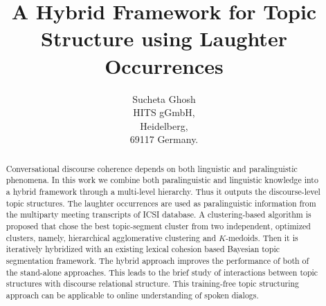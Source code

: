 \documentclass{article}
\title{A Hybrid Framework for Topic Structure using Laughter Occurrences}
\author{
Sucheta Ghosh\\
        HITS gGmbH,\\
        Heidelberg,\\
        69117 Germany.
}
\begin{document}
\maketitle

\begin{abstract}
Conversational discourse coherence depends on both linguistic and paralinguistic phenomena. In this work we combine both paralinguistic and linguistic knowledge into a hybrid framework through a multi-level hierarchy. Thus it outputs the discourse-level topic structures. The laughter occurrences are used as paralinguistic information from the multiparty meeting transcripts of ICSI database. A clustering-based algorithm is proposed that chose the best topic-segment cluster from two independent, optimized clusters, namely, hierarchical agglomerative clustering and $K$-medoids. Then it is iteratively hybridized with an existing lexical cohesion based Bayesian topic segmentation framework. The hybrid approach improves the performance of both of the stand-alone approaches. This leads to the brief study of interactions between topic structures with discourse relational structure. This training-free topic structuring approach can be applicable to online understanding of spoken dialogs.
\end{abstract}


\end{document}
